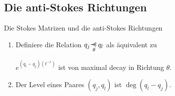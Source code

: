 \subsection{Die anti-Stokes Richtungen}
\begin{frame}{Die Stokes Matrizen und die anti-Stokes Richtungen}
  \begin{defn}
    \begin{enumerate}
    \item Definiere die Relation $q_j\myrel{\theta}q_l$ als äquivalent zu
      \begin{einr}
        $e^{(q_l-q_j)(t^{-1})}$ ist von maximal decay in
        Richtung $\theta$.
      \end{einr}
      \item<3-> Der Level eines Paares $(q_j,q_l)$ ist $\deg(q_l-q_j)$.
    \end{enumerate}
  \end{defn}
\end{frame}

